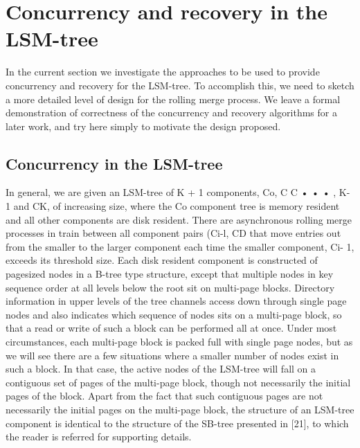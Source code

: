 \documentclass[a4paper,11pt,notitlepage,twoside,openright]{article}
\begin{document}
\hypertarget{concurrency-and-recovery-in-the-lsm-tree}{%
\section{Concurrency and recovery in the
LSM-tree}\label{concurrency-and-recovery-in-the-lsm-tree}}


In the current section we investigate the approaches to be used to
provide concurrency and recovery for the LSM-tree. To accomplish this,
we need to sketch a more detailed level of design for the rolling merge
process. We leave a formal demonstration of correctness of the
concurrency and recovery algorithms for a later work, and try here
simply to motivate the design proposed.


\hypertarget{concurrency-in-the-lsm-tree}{%
\subsection{Concurrency in the
LSM-tree}\label{concurrency-in-the-lsm-tree}}


In general, we are given an LSM-tree of K + 1 components, Co, C C • • •
, K-1 and CK, of increasing size, where the Co component tree is memory
resident and all other components are disk resident. There are
asynchronous rolling merge processes in train between all component
pairs (Ci-l, CD that move entries out from the smaller to the larger
component each time the smaller component, Ci- 1, exceeds its threshold
size. Each disk resident component is constructed of pagesized nodes in
a B-tree type structure, except that multiple nodes in key sequence
order at all levels below the root sit on multi-page blocks. Directory
information in upper levels of the tree channels access down through
single page nodes and also indicates which sequence of nodes sits on a
multi-page block, so that a read or write of such a block can be
performed all at once. Under most circumstances, each multi-page block
is packed full with single page nodes, but as we will see there are a
few situations where a smaller number of nodes exist in such a block. In
that case, the active nodes of the LSM-tree will fall on a contiguous
set of pages of the multi-page block, though not necessarily the initial
pages of the block. Apart from the fact that such contiguous pages are
not necessarily the initial pages on the multi-page block, the structure
of an LSM-tree component is identical to the structure of the SB-tree
presented in {[}21{]}, to which the reader is referred for supporting
details.
\end{document}
